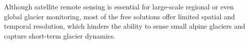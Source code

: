 Although satellite remote sensing is essential for large-scale regional or even global glacier monitoring, most of the free solutions offer limited spatial and temporal resolution, which hinders the ability to sense small alpine glaciers and capture short-term glacier dynamics. 










